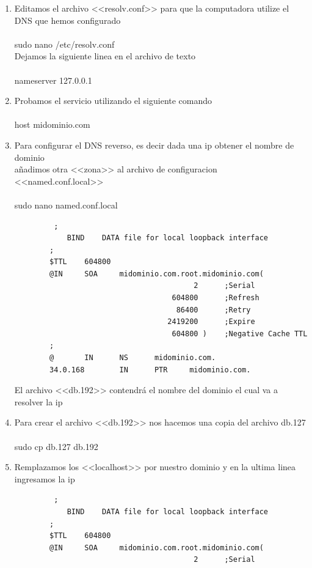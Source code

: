 \begin{enumerate}
    \item Editamos el archivo <<resolv.conf>> para que la computadora utilize el DNS que hemos configurado\\
    \\sudo nano /etc/resolv.conf\\
    Dejamos la siguiente linea en el archivo de texto\\
    \\nameserver 127.0.0.1\\
    \item Probamos el servicio utilizando el siguiente comando\\
    \\host midominio.com\\
    
\clearpage
    \item Para configurar el DNS reverso, es decir dada una ip obtener el nombre de dominio\\
    añadimos otra <<zona>> al archivo de configuracion <<named.conf.local>>\\
    \\sudo nano named.conf.local
     \begin{verbatim}
         ;
            BIND    DATA file for local loopback interface
        ;
        $TTL    604800
        @IN     SOA     midominio.com.root.midominio.com(
                                         2      ;Serial
                                    604800      ;Refresh
                                     86400      ;Retry
                                   2419200      ;Expire
                                    604800 )    ;Negative Cache TTL
        ;
        @       IN      NS      midominio.com.
        34.0.168        IN      PTR     midominio.com.
    \end{verbatim}
    El archivo <<db.192>> contendrá el nombre del dominio el cual va a resolver la ip
    \item Para crear el archivo <<db.192>> nos hacemos una copia del archivo db.127\\
    \\sudo cp db.127 db.192
    \item Remplazamos los <<localhost>> por nuestro dominio y en la ultima linea ingresamos la ip
     \begin{verbatim}
         ;
            BIND    DATA file for local loopback interface
        ;
        $TTL    604800
        @IN     SOA     midominio.com.root.midominio.com(
                                         2      ;Serial

\end{verbatim}
\end{enumerate}
